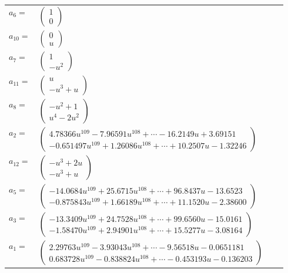 \documentclass[1p]{elsarticle_modified}
\theoremstyle{definition}
\begin{document}
\begin{tabular}{m{7pt} m{180pt} m{7pt} m{180pt} }
\flushright $a_{6}=$&$\begin{pmatrix}1\\0\end{pmatrix}$ \\
\flushright $a_{10}=$&$\begin{pmatrix}0\\u\end{pmatrix}$ \\
\flushright $a_{7}=$&$\begin{pmatrix}1\\- u^2\end{pmatrix}$ \\
\flushright $a_{11}=$&$\begin{pmatrix}u\\- u^3+u\end{pmatrix}$ \\
\flushright $a_{8}=$&$\begin{pmatrix}- u^2+1\\u^4-2 u^2\end{pmatrix}$ \\
\flushright $a_{2}=$&$\begin{pmatrix}4.78366 u^{109}-7.96591 u^{108}+\cdots-16.2149 u+3.69151\\-0.651497 u^{109}+1.26086 u^{108}+\cdots+10.2507 u-1.32246\end{pmatrix}$ \\
\flushright $a_{12}=$&$\begin{pmatrix}- u^3+2 u\\- u^3+u\end{pmatrix}$ \\
\flushright $a_{5}=$&$\begin{pmatrix}-14.0684 u^{109}+25.6715 u^{108}+\cdots+96.8437 u-13.6523\\-0.875843 u^{109}+1.66189 u^{108}+\cdots+11.1520 u-2.38600\end{pmatrix}$ \\
\flushright $a_{3}=$&$\begin{pmatrix}-13.3409 u^{109}+24.7528 u^{108}+\cdots+99.6560 u-15.0161\\-1.58470 u^{109}+2.94901 u^{108}+\cdots+15.5277 u-3.08164\end{pmatrix}$ \\
\flushright $a_{1}=$&$\begin{pmatrix}2.29763 u^{109}-3.93043 u^{108}+\cdots-9.56518 u-0.0651181\\0.683728 u^{109}-0.838824 u^{108}+\cdots-0.453193 u-0.136203\end{pmatrix}$ \\

\end{tabular}
\end{document}
